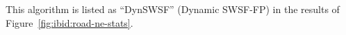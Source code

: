 
This algorithm is listed as ``DynSWSF''
(Dynamic SWSF-FP)
in the results of Figure~\ref{fig:ibid:road-ne-stats}.


%
%
%
%
%
%
%
